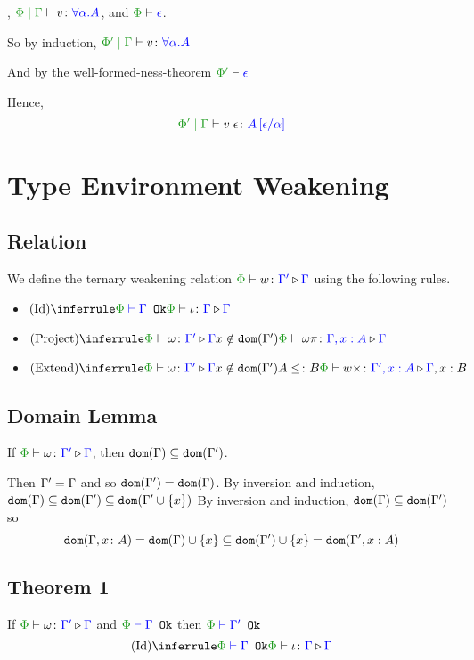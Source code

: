 {    

    \bi, $\gpetyperelation{v}{\all{\a}{A}}$, and $\wellformed{\P}{\e}$.

    So by induction, $\gppetyperelation{v}{\all{\a}{A}}$

    And by the well-formed-ness-theorem $\wellformed{\P'}{\e}$

    Hence, \begin{equation}
        \gppetyperelation{\eapp{v}{\e}}{A\ssub{\a}{\e}}
    \end{equation}

    \section{Type Environment Weakening}
    \subsection{Relation}
    We define the ternary weakening relation $\pewrel{w}{\G'}{\G}$ using the following rules.


    \begin{itemize}
        \item $\ntreeruleI{Id}{\wellformedok{\P}{\G}}{\pewrel{\i}{\G}{\G}}$
        \item $\ntreeruleII{Project}{\pewrel{\w}{\G'}{\G}}{ x \notin \dom{\G'}}{\pewrel{\w \pi}{\G, x: A}{\G}}$
        \item $\ntreeruleIII{Extend}{\pewrel{\w}{\G'}{\G}}{ x \notin \dom{\G'}}{ A \subtype B}{\pewrel{w \x}{\G', x: A}{\G, x: B}}$
    \end{itemize}

    \subsection{Domain Lemma}
    If $\pewrel{\w}{\G'}{\G}$, then $\texttt{dom}(\Gamma)\subseteq \texttt{dom}(\Gamma')$.

    \proof
    Then $\Gamma' = \Gamma$ and so $\texttt{dom}(\Gamma') = \texttt{dom}(\Gamma)$.
    By inversion and induction, $\texttt{dom}(\Gamma)\subseteq\texttt{dom}(\Gamma')\subseteq\texttt{dom}(\Gamma'\cup\left\{x\right\})$
    By inversion and induction, $\texttt{dom}(\Gamma)\subseteq\texttt{dom}(\Gamma')$ so 
    $$\texttt{dom}(\Gamma, x\colon A) = \texttt{dom}(\Gamma)\cup\left\{x\right\} \subseteq\texttt{dom}(\Gamma')\cup\left\{x\right\} = \texttt{dom}(\Gamma',x:A)$$
    \subsection{Theorem 1}
    If $\pewrel{\w}{\G'}{\G}$ and $\wellformedok{\P}{\G}$ then $\wellformedok{\P}{\G'}$
    \proof
    $$\ntreeruleI{Id}{\wellformedok{\P}{\G}}{\pewrel{\i}{\G}{\G}}$$

}
